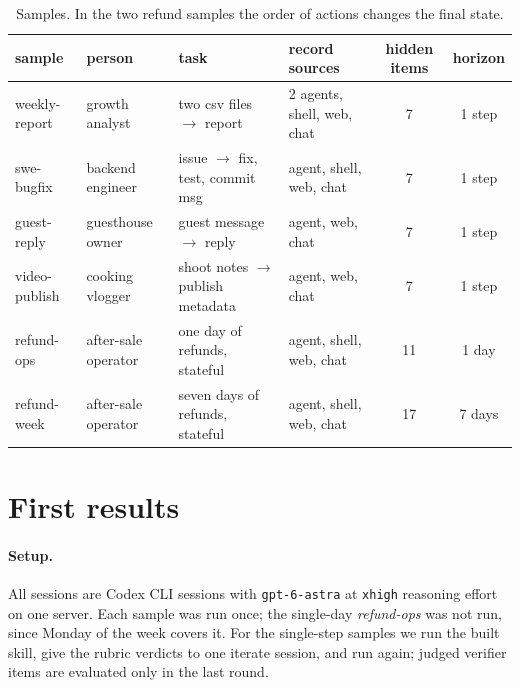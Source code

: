 \documentclass[10pt]{article}
\begin{document}
\begin{table}[h]
\centering\footnotesize\setlength{\tabcolsep}{4pt}
\begin{tabular}{@{}llllcc@{}}
\toprule
sample & person & task & record sources & hidden items & horizon \\
\midrule
weekly-report & growth analyst & two csv files $\rightarrow$ report & 2 agents, shell, web, chat & 7 & 1 step \\
swe-bugfix & backend engineer & issue $\rightarrow$ fix, test, commit msg & agent, shell, web, chat & 7 & 1 step \\
guest-reply & guesthouse owner & guest message $\rightarrow$ reply & agent, web, chat & 7 & 1 step \\
video-publish & cooking vlogger & shoot notes $\rightarrow$ publish metadata & agent, web, chat & 7 & 1 step \\
refund-ops & after-sale operator & one day of refunds, stateful & agent, shell, web, chat & 11 & 1 day \\
refund-week & after-sale operator & seven days of refunds, stateful & agent, shell, web, chat & 17 & 7 days \\
\bottomrule
\end{tabular}
\caption{Samples. In the two refund samples the order of actions changes the final state.}
\label{tab:samples}
\end{table}

\section{First results}
\label{sec:results}

\paragraph{Setup.} All sessions are Codex CLI sessions with \texttt{gpt-6-astra} at \texttt{xhigh} reasoning
effort on one server. Each sample was run once; the single-day \emph{refund-ops} was not run, since Monday of the week covers it. For the single-step samples we run the built skill, give the
rubric verdicts to one iterate session, and run again; judged verifier items are evaluated only in the last round.
\end{document}
